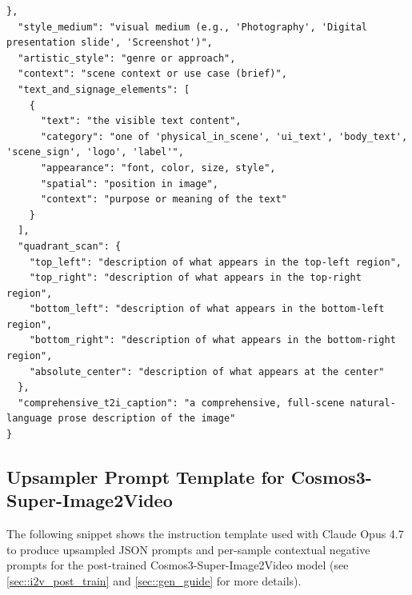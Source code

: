 \documentclass{llmxive}
\begin{document}
\begin{tcolorbox}
\begin{Verbatim}[breaklines=true,breakanywhere=true,fontsize=\scriptsize]
  },
  "style_medium": "visual medium (e.g., 'Photography', 'Digital presentation slide', 'Screenshot')",
  "artistic_style": "genre or approach",
  "context": "scene context or use case (brief)",
  "text_and_signage_elements": [
    {
      "text": "the visible text content",
      "category": "one of 'physical_in_scene', 'ui_text', 'body_text', 'scene_sign', 'logo', 'label'",
      "appearance": "font, color, size, style",
      "spatial": "position in image",
      "context": "purpose or meaning of the text"
    }
  ],
  "quadrant_scan": {
    "top_left": "description of what appears in the top-left region",
    "top_right": "description of what appears in the top-right region",
    "bottom_left": "description of what appears in the bottom-left region",
    "bottom_right": "description of what appears in the bottom-right region",
    "absolute_center": "description of what appears at the center"
  },
  "comprehensive_t2i_caption": "a comprehensive, full-scene natural-language prose description of the image"
}
\end{Verbatim}
\end{tcolorbox}


\subsection{Upsampler Prompt Template for Cosmos3-Super-Image2Video}
\label{appendix:sft_i2v_upsampler_prompt}

The following snippet shows the instruction template used with Claude Opus 4.7 to produce upsampled JSON prompts and per-sample contextual negative prompts for the post-trained Cosmos3-Super-Image2Video model (see \cref{sec::i2v_post_train} and \cref{sec::gen_guide} for more details).
\end{document}
